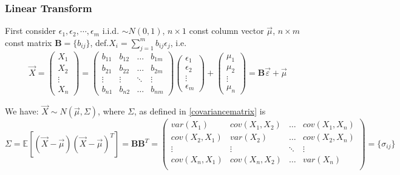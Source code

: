 \subsubsection{Linear Transform}
    First consider $\epsilon_1,\epsilon_2,\cdots,\epsilon_m$ i.i.d. $\sim N(0,1)$, $n\times 1$ const column vector $\vec{\mu}$, $n\times m$ const matrix $\bm{B}=\{b_{ij}\}$, def.$X_i={\displaystyle\sum_{j=1}^m b_{ij}\epsilon_j}$, i.e.
    \begin{equation}
        \vec{X}=
        \begin{pmatrix}
            X_1\\X_2\\ \vdots\\X_n
        \end{pmatrix}
        =
        \begin{pmatrix}
            b_{11}&b_{12}&\ldots&b_{1m}\\
            b_{21}&b_{22}&\ldots&b_{2m}\\
            \vdots&\vdots&\ddots&\vdots\\
            b_{n1}&b_{n2}&\ldots&b_{nm}
        \end{pmatrix}
        \begin{pmatrix}
            \epsilon_1\\
            \epsilon_2\\
            \vdots\\
            \epsilon_m
        \end{pmatrix}
        +\begin{pmatrix}
            \mu _1\\\mu _2\\ \vdots\\\mu _n
        \end{pmatrix}=\bm{B}\vec{\varepsilon }+\vec{\mu }
    \end{equation}

    
    We have: $\vec{X}\sim N(\vec{\mu},\Sigma)$, where $\Sigma$, as defined in \autoref{covariancematrix} is
    \begin{equation}
        \Sigma=\mathbb{E}[(\vec{X}-\vec{\mu})(\vec{X}-\vec{\mu})^T]=\bm{BB}^T=
        \begin{pmatrix}
        var(X_1) & cov(X_1,X_2) & \ldots & cov(X_1,X_n)\\
        cov(X_2,X_1) & var(X_2) & \ldots & cov(X_2,X_n)\\
        \vdots & \vdots & \ddots & \vdots\\
        cov(X_n,X_1) & cov(X_n,X_2) & \ldots & var(X_n)\\
        \end{pmatrix}  
        =\{\sigma_{ij}\}  
    \end{equation}

